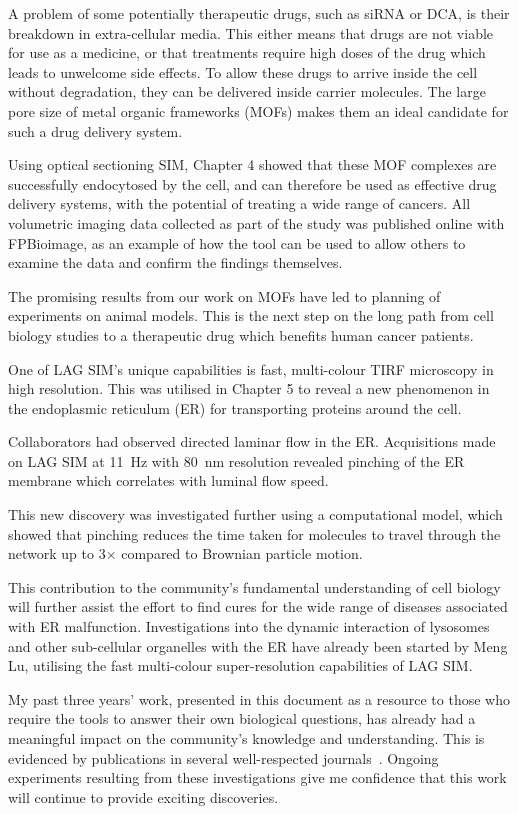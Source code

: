 A problem of some potentially therapeutic drugs, such as siRNA or DCA, is their breakdown in extra-cellular media. 
This either means that drugs are not viable for use as a medicine, or that treatments require high doses of the drug which leads to unwelcome side effects. 
To allow these drugs to arrive inside the cell without degradation, they can be delivered inside carrier molecules. 
The large pore size of metal organic frameworks (MOFs) makes them an ideal candidate for such a drug delivery system. 

Using optical sectioning SIM, Chapter 4 showed that these MOF complexes are successfully endocytosed by the cell, and can therefore be used as effective drug delivery systems, with the potential of treating a wide range of cancers. 
All volumetric imaging data collected as part of the study was published online with FPBioimage, as an example of how the tool can be used to allow others to examine the data and confirm the findings themselves. 

The promising results from our work on MOFs have led to planning of experiments on animal models. 
This is the next step on the long path from cell biology studies to a therapeutic drug which benefits human cancer patients. 

One of LAG SIM's unique capabilities is fast, multi-colour TIRF microscopy in high resolution. 
This was utilised in Chapter 5 to reveal a new phenomenon in the endoplasmic reticulum (ER) for transporting proteins around the cell. 

Collaborators had observed directed laminar flow in the ER.
Acquisitions made on LAG SIM at \SI{11}{\hertz} with \SI{80}{\nano\metre} resolution revealed pinching of the ER membrane which correlates with luminal flow speed. 

This new discovery was investigated further using a computational model, which showed that pinching reduces the time taken for molecules to travel through the network up to 3$\times$ compared to Brownian particle motion. 

This contribution to the community's fundamental understanding of cell biology will further assist the effort to find cures for the wide range of diseases associated with ER malfunction.
Investigations into the dynamic interaction of lysosomes and other sub-cellular organelles with the ER have already been started by Meng Lu, utilising the fast multi-colour super-resolution capabilities of LAG SIM. 

My past three years' work, presented in this document as a resource to those who require the tools to answer their own biological questions, has already had a meaningful impact on the community's knowledge and understanding.
This is evidenced by publications in several well-respected journals~\cite{teplensky2017temperature, fantham2017new, moghadam2018computer, holcman2018single, lautenschlager2018c}. 
Ongoing experiments resulting from these investigations give me confidence that this work will continue to provide exciting discoveries. 